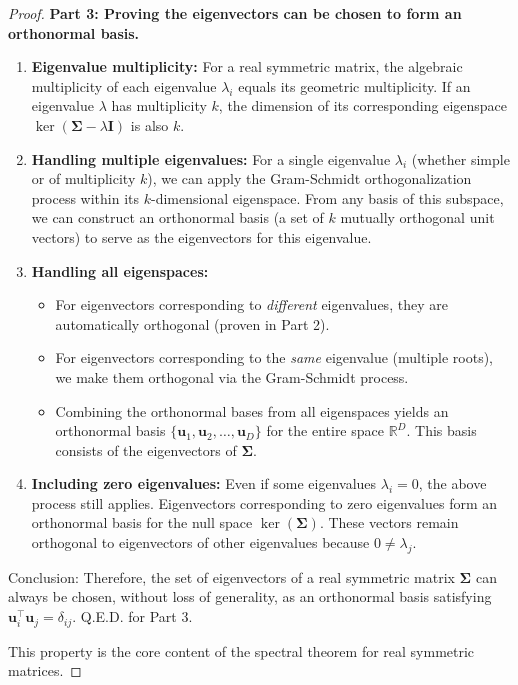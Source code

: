 \documentclass[../main.tex]{subfiles}
\begin{document}
\begin{proof}
\noindent\textbf{Part 3: Proving the eigenvectors can be chosen to form an orthonormal basis.}
\begin{enumerate}
    \item \textbf{Eigenvalue multiplicity:} For a real symmetric matrix, the algebraic multiplicity of each eigenvalue $\lambda_i$ equals its geometric multiplicity. If an eigenvalue $\lambda$ has multiplicity $k$, the dimension of its corresponding eigenspace $\ker(\boldsymbol{\Sigma} - \lambda \mathbf{I})$ is also $k$.
    \item \textbf{Handling multiple eigenvalues:} For a single eigenvalue $\lambda_i$ (whether simple or of multiplicity $k$), we can apply the Gram-Schmidt orthogonalization process within its $k$-dimensional eigenspace. From any basis of this subspace, we can construct an orthonormal basis (a set of $k$ mutually orthogonal unit vectors) to serve as the eigenvectors for this eigenvalue.
    \item \textbf{Handling all eigenspaces:}
    \begin{itemize}
        \item For eigenvectors corresponding to \textit{different} eigenvalues, they are automatically orthogonal (proven in Part 2).
        \item For eigenvectors corresponding to the \textit{same} eigenvalue (multiple roots), we make them orthogonal via the Gram-Schmidt process.
        \item Combining the orthonormal bases from all eigenspaces yields an orthonormal basis $\{\mathbf{u}_1, \mathbf{u}_2, \ldots, \mathbf{u}_D\}$ for the entire space $\mathbb{R}^D$. This basis consists of the eigenvectors of $\boldsymbol{\Sigma}$.
    \end{itemize}
    \item \textbf{Including zero eigenvalues:} Even if some eigenvalues $\lambda_i = 0$, the above process still applies. Eigenvectors corresponding to zero eigenvalues form an orthonormal basis for the null space $\ker(\boldsymbol{\Sigma})$. These vectors remain orthogonal to eigenvectors of other eigenvalues because $0 \neq \lambda_j$.
\end{enumerate}
Conclusion: Therefore, the set of eigenvectors of a real symmetric matrix $\boldsymbol{\Sigma}$ can always be chosen, without loss of generality, as an orthonormal basis satisfying $\mathbf{u}_i^\top \mathbf{u}_j = \delta_{ij}$. Q.E.D. for Part 3.

This property is the core content of the spectral theorem for real symmetric matrices.
\end{proof}
\end{document}
